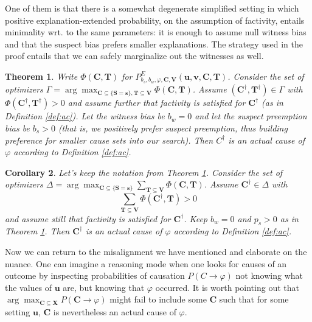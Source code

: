 \documentclass[twoside,11pt]{article}
\newtheorem{theorem}{Theorem}
\newtheorem{corollary}[theorem]{Corollary}
\begin{document}
One of them is that there is a somewhat degenerate simplified setting in which positive explanation-extended probability, on the assumption of factivity, entails minimality wrt. to the same parameters: it is enough to assume null witness bias and that the suspect bias prefers smaller explanations. The strategy used in the proof entails that we can safely marginalize out the witnesses as well.


\begin{theorem} \label{th:local_max_to_ac} Write $\Phi (\mathbf{C}, \mathbf{T})$ for $P^{E}_{b_s, b_w, \varphi, \mathbf{C}, \mathbf{V}}(\mathbf{u}, \mathbf{v}, \mathbf{C}, \mathbf{T})$. Consider the set of optimizers  $\Gamma = \arg\max_{\mathbf{C} \subseteq \{\mathbf{S} = \mathbf{s}\}, \mathbf{T} \subseteq \mathbf{V}} \Phi(\mathbf{C}, \mathbf{T})$.  Assume $(\mathbf{C^\dagger}, \mathbf{T^\dagger})\in \Gamma$ with $\Phi(\mathbf{C^\dagger}, \mathbf{T^\dagger})>0$ and assume further that factivity is satisfied for $\mathbf{C^\dagger}$ (as in Definition \ref{def:ac}). Let the witness bias be $b_w=0$ and let the suspect preemption bias be $b_s>0$ (that is, we positively prefer suspect preemption, thus building preference for smaller cause sets into our search). Then $C^\dagger$ is an actual cause of $\varphi$ according to Definition \ref{def:ac}.
\end{theorem}



\begin{corollary}\label{cor:marginalize} Let's keep the notation from Theorem \ref{th:local_max_to_ac}. Consider the set   of optimizers  $\Delta = \arg\max_{\mathbf{C} \subseteq \{\mathbf{S} = \mathbf{s}\}} \sum_{\mathbf{T} \subseteq \mathbf{V}} \Phi(\mathbf{C}, \mathbf{T})$.  Assume $\mathbf{C^\dagger}\in \Delta$ with \[\sum_{\mathbf{T} \subseteq \mathbf{V}} \Phi(\mathbf{C^\dagger}, \mathbf{T})>0\] and assume still that factivity is satisfied for $\mathbf{C^\dagger}$. Keep $b_w=0$ and $p_s>0$  as in Theorem \ref{th:local_max_to_ac}. Then $\mathbf{C^\dagger}$ is an actual cause of $\varphi$ according to Definition \ref{def:ac}.
\end{corollary}



Now we can return to the misalignment we have mentioned and elaborate on the nuance. One can imagine a reasoning mode when one looks for causes of an outcome by inspecting probabilities of causation $P(C \rightarrow \varphi)$ not knowing what the values of $\mathbf{u}$ are, but knowing that $\varphi$ occurred. It is worth pointing out that  $\arg\max_{\mathbf{C} \subseteq \mathbf{X}}P(\mathbf{C} \rightarrow \varphi)$ might fail to include some $\mathbf{C}$ such that for some setting $\mathbf{u}$, $\mathbf{C}$ is nevertheless an actual cause of $\varphi$.
\end{document}
